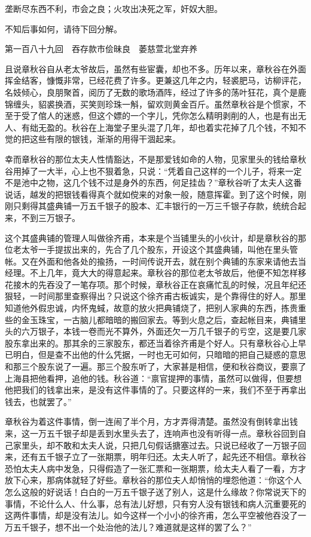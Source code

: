 \documentclass[12pt,UTF8]{ctexbook}
\begin{document}
{{{垄断尽东西不利，市会之良；火攻出决死之军，奸奴大胆。

不知后事如何，请待下回分解。





第一百八十九回　吞存款市侩昧良　萎慈萱北堂弃养





且说章秋谷自从老太爷故后，虽然有些宦囊，却也不多。历年以来，章秋谷在外面挥金结客，慷慨非常，已经花费了许多。更兼这几年之内，轻裘肥马，访柳评花，名妓倾心，良朋聚首，阅历了无数的歌场酒阵，经过了许多的荡叶狂花，真个是鹿锦缠头，貂裘换酒，买笑则珍珠一斛，留欢则黄金百斤。虽然章秋谷是个惯家，不至于受了倌人的迷惑，但这个嫖的一个字儿，凭你怎么精明剥削的人，也是有出无人、有绌无盈的。秋谷在上海堂子里头混了几年，却也着实花掉了几个钱，不知不觉的把这些有限的银钱，渐渐的用得干涸起来。

幸而章秋谷的那位太夫人性情豁达，不是那爱钱如命的人物，见家里头的钱给章秋谷用掉了一大半，心上也不狠着急，只说：“凭着自己这样的一个儿子，将来一定不是池中之物，这几个钱不过是身外的东西，何足挂齿？”章秋谷听了太夫人这番说话，越发的把银钱看得真个就如傥来的对象一般，随意挥霍。到了这个时候，刚刚只剩得其盛典铺一万五千银子的股本、汇丰银行的一万三千银子存款，统统合起来，不到三万银子。

这个其盛典铺的管理人叫做徐齐甫，本来是个当铺里头的小伙计，却是章秋谷的那位老太爷一手提拔出来的，先合了几个股东，开设这个其盛典铺，叫他在里头管帐。又在外面和他各处的揄扬，一时间传说开去，就在别个典铺的东家来请他去当经理。不上几年，竟大大的得意起来。章秋谷的那位老太爷故后，他便不知怎样移花接木的先吞没了一笔存项。那个时候，章秋谷正在哀痛忙乱的时候，况且年纪还狠轻，一时间那里查察得出？只说这个徐齐甫古板诚实，是个靠得住的好人。那里知道他外假忠诚，内怀鬼蜮，故意的放火把典铺烧了，把别人家典的东西，拣贵重些的金玉珠宝，一古脑儿都暗暗的搬回家去。等到火息之后，查起帐目来，典铺里头的六万银子，本钱一卷而光不算外，外面还欠一万几千银子的亏空，这是要几家股东拿出来的。那其余的三家股东，都还当着徐齐甫是个好人。只有章秋谷心上早已明白，但是查不出他的什么凭据，一时也无可如何，只暗暗的把自己疑惑的意思和那三个股东说了一遍。那三个股东听了，大家甚是相信，便和秋谷商议，要禀了上海县把他看押，追他的钱。秋谷道：“禀官提押的事情，虽然可以做得，但要想他把我们的钱拿出来，是没有这件事情的了。只要这样的一来，我们不至于再拿出钱去，也就罢了。”

章秋谷为着这件事情，倒一连闹了半个月，方才弄得清楚。虽然没有倒转拿出钱来，这一万五千银子却是丢到水里头去了，连响声也没有听得一点。章秋谷回到自己家里头，却不敢和太夫人说，只把几句假话搪塞过去。只说已经收了一万银子回来，还有五千银子立了一张期票，明年归还。太夫人听了，起先还不相信。章秋谷恐怕太夫人病中发急，只得假造了一张汇票和一张期票，给太夫人看了一看，方才放下心来，那病体就轻了好些。章秋谷的那位夫人却悄悄的埋怨他道：“你这个人怎么这般的好说话！白白的一万五千银子送了别人，这是什么缘故？你常说天下的事情，不论什么人、什么事，总有法儿好想，只有穷人没有银钱和病人沉重要死的这两件事情，却是没有法儿。如今这样一个小小的徐齐甫，怎么平空被他吞没了一万五千银子，想不出一个处治他的法儿？难道就是这样的罢了么？”

}}}
\end{document}
